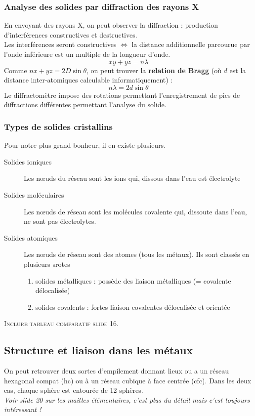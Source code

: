 \documentclass[12pt, a4paper]{article}
\begin{document}
\subsubsection*{Analyse des solides par diffraction des rayons X}
En envoyant des rayons X, on peut observer la diffraction : production d'interférences constructives et destructives.\\
Les interférences seront constructives $\Leftrightarrow$ la distance additionnelle parcourue par l'onde inférieure est un multiple de la longueur d'onde.
$$xy + yz = n\lambda$$
Comme $nx + yz = 2D\sin \theta$, on peut trouver la \textbf{relation de Bragg} (où $d$ est la distance inter-atomiques calculable informatiquement) :
$$n\lambda = 2d\sin \theta$$
Le diffractomètre impose des rotations permettant l'enregistrement de pics de diffractions différentes permettant l'analyse du solide.

\subsubsection*{Types de solides cristallins}
Pour notre plus grand bonheur, il en existe plusieurs.
\begin{description}
\item[Solides ioniques] Les nœuds du réseau sont les ions qui, dissous dans l'eau est électrolyte 
\item[Solides moléculaires] Les nœuds de réseau sont les molécules covalente qui, dissoute dans l'eau, ne sont pas électrolytes.
\item[Solides atomiques] Les nœuds de réseau sont des atomes (tous les métaux). Ils sont classés en plusieurs srotes
\begin{enumerate}
\item solides métalliques : possède des liaison métalliques (= covalente délocalisée)
\item solides covalents : fortes liaison covalentes délocalisée et orientée
\end{enumerate}
\end{description}
\textsc{Inclure tableau comparatif slide 16.}


\subsection{Structure et liaison dans les métaux}
On peut retrouver deux sortes d'empilement donnant lieux ou a un réseau hexagonal compat (hc) ou à un réseau cubique à face centrée (cfc). Dans les deux cas, chaque sphère est entourée de 12 sphères.\\
\textit{Voir slide 20 sur les mailles élémentaires, c'est plus du détail mais c'est toujours intéressant !}
\end{document}
